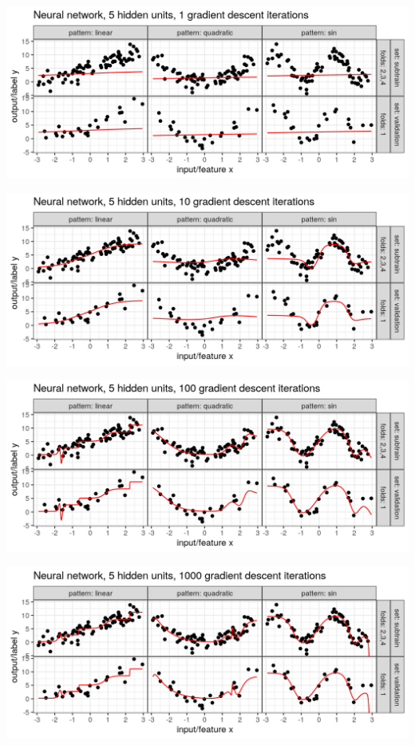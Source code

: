 
\begin{frame}
  \includegraphics[width=\textwidth]{figure-overfitting-pred-units=5-maxit=1.png}
\end{frame}


\begin{frame}
  \includegraphics[width=\textwidth]{figure-overfitting-pred-units=5-maxit=10.png}
\end{frame}


\begin{frame}
  \includegraphics[width=\textwidth]{figure-overfitting-pred-units=5-maxit=100.png}
\end{frame}


\begin{frame}
  \includegraphics[width=\textwidth]{figure-overfitting-pred-units=5-maxit=1000.png}
\end{frame}


